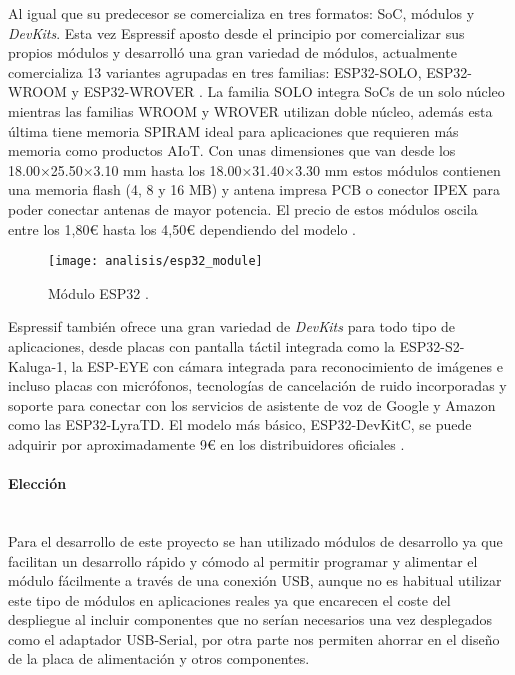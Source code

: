 \documentclass[../proyecto.tex]{subfiles}
\begin{document}
Al igual que su predecesor se comercializa en tres formatos: SoC, módulos y \textit{DevKits}. Esta vez Espressif aposto desde el principio por comercializar sus propios módulos y desarrolló una gran variedad de módulos, actualmente comercializa 13 variantes agrupadas en tres familias: ESP32-SOLO, ESP32-WROOM y ESP32-WROVER \cite{espressif_products_ordering_information}. La familia SOLO integra SoCs de un solo núcleo mientras las familias WROOM y WROVER utilizan doble núcleo, además esta última tiene memoria SPIRAM ideal para aplicaciones que requieren más memoria como productos AIoT. Con unas dimensiones que van desde los 18.00×25.50×3.10 mm hasta los 18.00×31.40×3.30 mm estos módulos contienen una memoria flash (4, 8 y 16 MB) y antena impresa PCB o conector IPEX para poder conectar antenas de mayor potencia. El precio de estos módulos oscila entre los 1,80€ hasta los 4,50€ dependiendo del modelo \cite{espressif_provider_digikey} \cite{espressif_provider_mouser}.\\

\begin{figure}[H]
\centering
\texttt{[image: analisis/esp32\_module]}
\caption{Módulo ESP32  \cite{esp32_module}.}
\label{fig:esp32_module}
\end{figure}

Espressif también ofrece una gran variedad de \textit{DevKits} para todo tipo de aplicaciones, desde placas con pantalla táctil integrada como la ESP32-S2-Kaluga-1, la ESP-EYE con cámara integrada para reconocimiento de imágenes e incluso placas con micrófonos, tecnologías de cancelación de ruido incorporadas y soporte para conectar con los servicios de asistente de voz de Google y Amazon como las ESP32-LyraTD. El modelo más básico, ESP32-DevKitC, se puede adquirir por aproximadamente 9€ en los distribuidores oficiales \cite{espressif_provider_digikey} \cite{espressif_provider_mouser}.\\

\paragraph{Elección}\mbox{}\\

Para el desarrollo de este proyecto se han utilizado módulos de desarrollo ya que facilitan un desarrollo rápido y cómodo al permitir programar y alimentar el módulo fácilmente a través de una conexión USB, aunque no es habitual utilizar este tipo de módulos en aplicaciones reales ya que encarecen el coste del despliegue al incluir componentes que no serían necesarios una vez desplegados como el adaptador USB-Serial, por otra parte nos permiten ahorrar en el diseño de la placa de alimentación y otros componentes.\\
\end{document}
